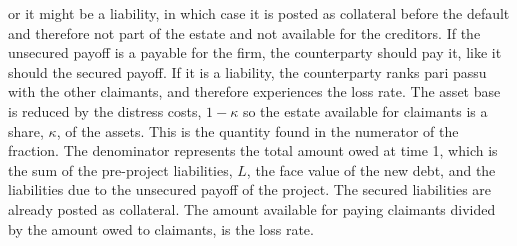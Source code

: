 \documentclass[../main.tex]{subfiles}
\begin{document}
        or it might be a liability, in which case it is posted as collateral before the default
        and therefore not part of the estate and not available for the creditors.
        If the unsecured payoff is a payable for the firm, the counterparty should pay it, like it should the secured payoff.
        If it is a liability, the counterparty ranks pari passu with the other claimants,
        and therefore experiences the loss rate. 
        The asset base is reduced by the distress costs, $1-\kappa$ so the estate available for claimants
        is a share, $\kappa$, of the assets. 
        This is the quantity found in the numerator of the fraction.
        The denominator represents the total amount owed at time 1, 
        which is the sum of the pre-project liabilities, $L$, the face value of the new debt, 
        and the liabilities due to the unsecured payoff of the project.
        The secured liabilities are already posted as collateral.
        The amount available for paying claimants divided by the amount owed to claimants, is the loss rate.
\end{document}
